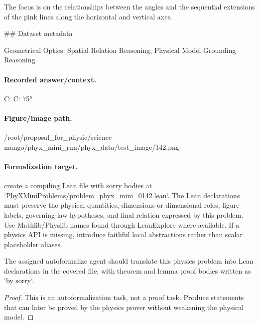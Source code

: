 The focus is on the relationships between the angles and the sequential extensions of the pink lines along the horizontal and vertical axes.

\#\# Dataset metadata

Geometrical Optics; Spatial Relation Reasoning, Physical Model Grounding Reasoning

\paragraph{Recorded answer/context.}
C: C: 75°

\paragraph{Figure/image path.}
/root/proposal\_for\_physic/science-mango/phyx\_mini\_run/phyx\_data/test\_image/142.png

\paragraph{Formalization target.}
create a compiling Lean file with sorry bodies at `PhyXMiniProblems/problem\_phyx\_mini\_0142.lean`. The Lean declarations must preserve the physical quantities, dimensions or dimensional roles, figure labels, governing-law hypotheses, and final relation expressed by this problem.
Use Mathlib/Physlib names found through LeanExplore where available. If a physics API is missing, introduce faithful local abstractions rather than scalar placeholder aliases.

\begin{theorem}
\label{thm:physics:phyx_mini_0142:target}
The assigned autoformalize agent should translate this physics problem into Lean declarations in the covered file, with theorem and lemma proof bodies written as `by sorry`.
\end{theorem}
\begin{proof}
This is an autoformalization task, not a proof task. Produce statements that can later be proved by the physics prover without weakening the physical model.
\end{proof}

